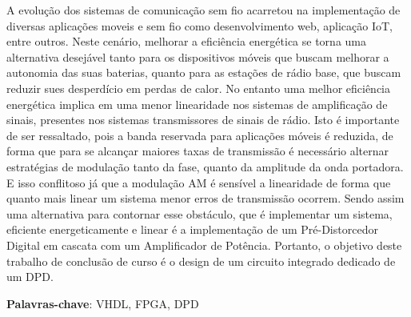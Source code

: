 A evolução dos sistemas de comunicação sem fio acarretou na implementação de diversas aplicações moveis e sem fio como desenvolvimento web, aplicação IoT, entre outros. Neste cenário, melhorar a eficiência energética se torna uma alternativa desejável tanto para os dispositivos móveis que buscam melhorar a autonomia das suas baterias, quanto para as estações de rádio base, que buscam reduzir sues desperdício em perdas de calor. No entanto uma melhor eficiência energética implica em uma menor linearidade nos sistemas de amplificação de sinais, presentes nos sistemas transmissores de sinais de rádio. Isto é importante de ser ressaltado, pois a banda reservada para aplicações móveis é reduzida, de forma que para se alcançar maiores taxas de transmissão é necessário alternar estratégias de modulação tanto da fase, quanto da amplitude da onda portadora. E isso conflitoso já que a modulação AM é sensível a linearidade de forma que quanto mais linear um sistema menor erros de transmissão ocorrem. Sendo assim uma alternativa para contornar esse obstáculo, que é implementar um sistema, eficiente energeticamente e linear é a implementação de um Pré-Distorcedor Digital em cascata com um Amplificador de Potência. Portanto, o objetivo deste trabalho de conclusão de curso é o design de um circuito integrado dedicado de um DPD.  

\textbf{Palavras-chave}: VHDL, FPGA, DPD 